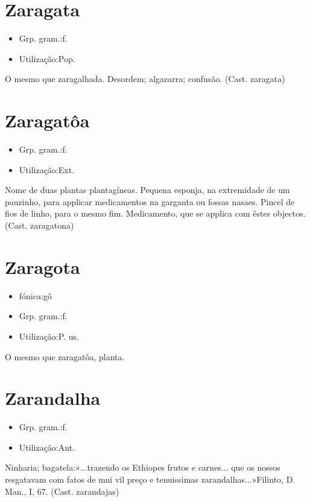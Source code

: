 \section{Zaragata}
\begin{itemize}
\item {Grp. gram.:f.}
\end{itemize}
\begin{itemize}
\item {Utilização:Pop.}
\end{itemize}
O mesmo que \textunderscore zaragalhada\textunderscore .
Desordem; algazarra; confusão.
(Cast. \textunderscore zaragata\textunderscore )
\section{Zaragatôa}
\begin{itemize}
\item {Grp. gram.:f.}
\end{itemize}
\begin{itemize}
\item {Utilização:Ext.}
\end{itemize}
Nome de duas plantas plantagíneas.
Pequena esponja, na extremidade de um pauzinho, para applicar medicamentos na garganta ou fossas nasaes.
Pincel de fios de linho, para o mesmo fim.
Medicamento, que se applica com êstes objectos.
(Cast. \textunderscore zaragatona\textunderscore )
\section{Zaragota}
\begin{itemize}
\item {fónica:gô}
\end{itemize}
\begin{itemize}
\item {Grp. gram.:f.}
\end{itemize}
\begin{itemize}
\item {Utilização:P. us.}
\end{itemize}
O mesmo que \textunderscore zaragatôa\textunderscore , planta.
\section{Zarandalha}
\begin{itemize}
\item {Grp. gram.:f.}
\end{itemize}
\begin{itemize}
\item {Utilização:Ant.}
\end{itemize}
Ninharia; bagatela:«\textunderscore ...trazendo os Ethiopes frutos e carnes... que os nossos resgatavam com fatos de mui vil preço e tenuissimas zarandalhas...\textunderscore »Filinto, \textunderscore D. Man.\textunderscore , I, 67.
(Cast. \textunderscore zarandajas\textunderscore )
